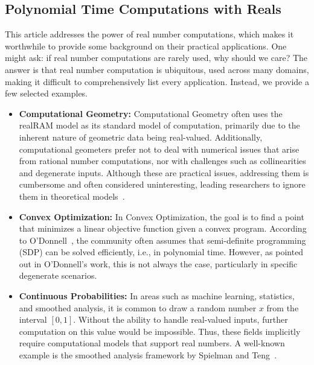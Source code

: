 \documentclass{article}
\begin{document}
\subsection{Polynomial Time Computations with Reals}
\label{sub:RealComputation}

This article addresses the power of real number computations, which makes it worthwhile to provide some background on their practical applications. One might ask: if real number computations are rarely used, why should we care? The answer is that real number computation is ubiquitous, used across many domains, making it difficult to comprehensively list every application. Instead, we provide a few selected examples.  

\begin{itemize}
\item \textbf{Computational Geometry:} Computational Geometry often uses the realRAM model as its standard model of computation, primarily due to the inherent nature of geometric data being real-valued. Additionally, computational geometers prefer not to deal with numerical issues that arise from rational number computations, nor with challenges such as collinearities and degenerate inputs. Although these are practical issues, addressing them is cumbersome and often considered uninteresting, leading researchers to ignore them in theoretical models~\cite{mark2008computational, de2000computational}.
\item \textbf{Convex Optimization:} In Convex Optimization, the goal is to find a point that minimizes a linear objective function given a convex program. According to O'Donnell~\cite{NotAutomatizable}, the community often assumes that semi-definite programming (SDP) can be solved efficiently, i.e., in polynomial time. However, as pointed out in O'Donnell's work, this is not always the case, particularly in specific degenerate scenarios.
\item \textbf{Continuous Probabilities:} In areas such as machine learning, statistics, and smoothed analysis, it is common to draw a random number $x$ from the interval $[0,1]$. Without the ability to handle real-valued inputs, further computation on this value would be impossible. Thus, these fields implicitly require computational models that support real numbers. A well-known example is the smoothed analysis framework by Spielman and Teng~\cite{spielman2009smoothed}.
\end{itemize}
\end{document}
